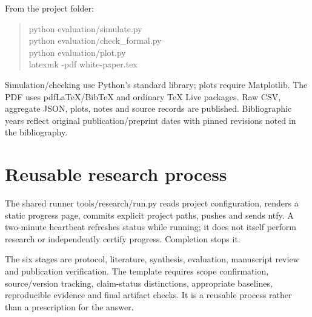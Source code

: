 \documentclass[11pt]{article}
\begin{document}
From the project folder:
\begin{quote}\small\textsf{python evaluation/simulate.py}\\\textsf{python evaluation/check\_formal.py}\\\textsf{python evaluation/plot.py}\\\textsf{latexmk -pdf white-paper.tex}\end{quote}
Simulation/checking use Python's standard library; plots require Matplotlib. The PDF uses pdfLaTeX/BibTeX and ordinary TeX Live packages. Raw CSV, aggregate JSON, plots, notes and source records are published. Bibliographic years reflect original publication/preprint dates with pinned revisions noted in the bibliography.

\section{Reusable research process}
The shared runner \textsf{tools/research/run.py} reads project configuration, renders a static progress page, commits explicit project paths, pushes and sends ntfy. A two-minute heartbeat refreshes status while running; it does not itself perform research or independently certify progress. Completion stops it.

The six stages are protocol, literature, synthesis, evaluation, manuscript review and publication verification. The template requires scope confirmation, source/version tracking, claim-status distinctions, appropriate baselines, reproducible evidence and final artifact checks. It is a reusable process rather than a prescription for the answer.

\clearpage\begingroup\small\setlength{\bibsep}{5pt}\endgroup
\end{document}
